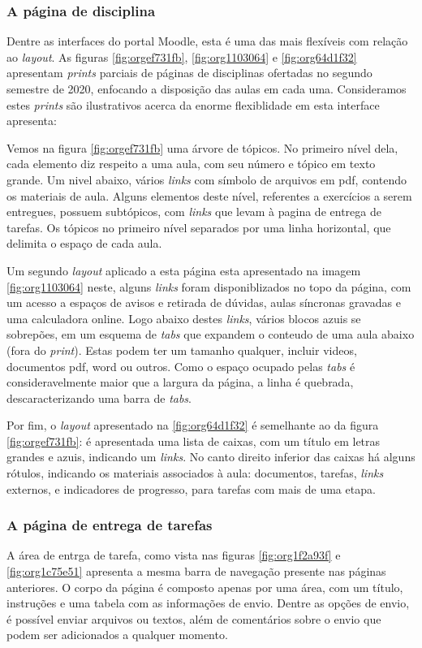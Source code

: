 \documentclass[11pt]{article}
\begin{document}
\subsubsection*{A página de disciplina}
\label{sec:org859912d}
Dentre as interfaces do portal Moodle, esta é uma das mais flexíveis
com relação ao \emph{layout}.  As figuras \ref{fig:orgef731fb}, \ref{fig:org1103064} e
\ref{fig:org64d1f32} apresentam \emph{prints} parciais de páginas de disciplinas
ofertadas no segundo semestre de 2020, enfocando a disposição das
aulas em cada uma. Consideramos estes \emph{prints} são ilustrativos acerca
da enorme flexiblidade em esta interface apresenta:

Vemos na figura \ref{fig:orgef731fb} uma árvore de tópicos. No primeiro nível
dela, cada elemento diz respeito a uma aula, com seu número e tópico
em texto grande.  Um nivel abaixo, vários \emph{links} com símbolo de
arquivos em pdf, contendo os materiais de aula.  Alguns elementos
deste nível, referentes a exercícios a serem entregues, possuem
subtópicos, com \emph{links} que levam à pagina de entrega de tarefas.  Os
tópicos no primeiro nível separados por uma linha horizontal, que
delimita o espaço de cada aula.

Um segundo \emph{layout} aplicado a esta página esta apresentado na imagem
\ref{fig:org1103064} neste, alguns \emph{links} foram disponiblizados no topo da
página, com um acesso a espaços de avisos e retirada de dúvidas, aulas
síncronas gravadas e uma calculadora online. Logo abaixo destes \emph{links},
vários blocos azuis se sobrepões, em um esquema de \emph{tabs} que expandem
o conteudo de uma aula abaixo (fora do \emph{print}). Estas podem ter um
tamanho qualquer, incluir videos, documentos pdf, word ou outros. Como
o espaço ocupado pelas \emph{tabs} é consideravelmente maior que a largura
da página, a linha é quebrada, descaracterizando uma barra de \emph{tabs}.

Por fim, o \emph{layout} apresentado na \ref{fig:org64d1f32} é semelhante ao da figura
\ref{fig:orgef731fb}: é apresentada uma lista de caixas, com um título em letras
grandes e azuis, indicando um \emph{links}. No canto direito inferior das
caixas há alguns rótulos, indicando os materiais associados à aula:
documentos, tarefas, \emph{links} externos, e indicadores de progresso,
para tarefas com mais de uma etapa.

\subsubsection*{A página de entrega de tarefas}
\label{sec:org98d8833}
A área de entrga de tarefa, como vista nas figuras \ref{fig:org1f2a93f} e
\ref{fig:org1c75e51} apresenta a mesma barra de navegação presente nas páginas
anteriores. O corpo da página é composto apenas por uma área, com um
título, instruções e uma tabela com as informações de envio. Dentre as
opções de envio, é possível enviar arquivos ou textos, além de
comentários sobre o envio que podem ser adicionados a qualquer
momento.
\end{document}
